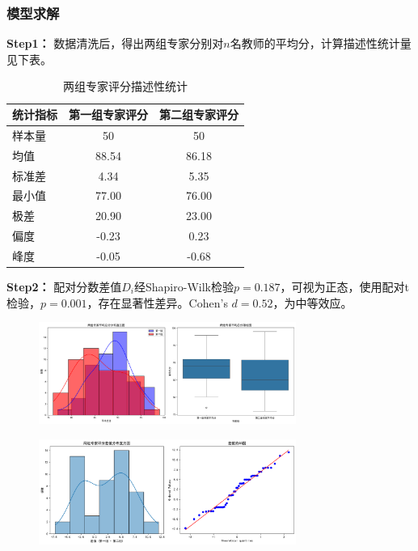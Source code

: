 \documentclass[withoutpreface,bwprint]{cumcmthesis}
\begin{document}
\subsubsection{模型求解}
\textbf{Step1：} 数据清洗后，得出两组专家分别对$n$名教师的平均分，计算描述性统计量见下表。

\begin{table}[H]
\centering
\caption{两组专家评分描述性统计}
\label{tab:descstat}
\begin{tabular}{lcc}
\toprule
统计指标 & 第一组专家评分 & 第二组专家评分 \\
\midrule
样本量      & 50        & 50        \\
均值        & 88.54     & 86.18     \\
标准差      & 4.34      & 5.35      \\
最小值      & 77.00     & 76.00     \\
极差        & 20.90     & 23.00     \\
偏度        & -0.23     & 0.23      \\
峰度        & -0.05     & -0.68     \\
\bottomrule
\end{tabular}
\end{table}








\textbf{Step2：} 配对分数差值$D_i$经Shapiro-Wilk检验$ p = 0.187 $，可视为正态，使用配对t检验，$p=0.001$，存在显著性差异。Cohen's $d=0.52$，为中等效应。


\begin{figure}[ht]
\centering
\includegraphics[width=0.75\textwidth]{figures/descriptive_statistics.png}
\label{fig:单图}
\end{figure}

\begin{figure}[ht]
\centering
\includegraphics[width=0.75\textwidth]{figures/normality_test.png}
\label{fig:单图}
\end{figure}
\end{document}
